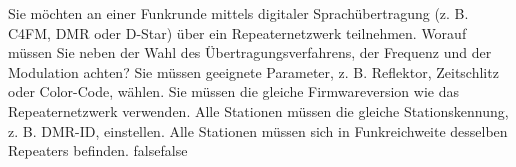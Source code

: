     {Sie möchten an einer Funkrunde mittels digitaler Sprachübertragung (z. B. C4FM, DMR oder D-Star) über ein Repeaternetzwerk teilnehmen. Worauf müssen Sie neben der Wahl des Übertragungsverfahrens, der Frequenz und der Modulation achten?}
    {Sie müssen geeignete Parameter, z. B. Reflektor, Zeitschlitz oder Color-Code, wählen.}
    {Sie müssen die gleiche Firmwareversion wie das Repeaternetzwerk verwenden.}
    {Alle Stationen müssen die gleiche Stationskennung, z. B. DMR-ID, einstellen.}
    {Alle Stationen müssen sich in Funkreichweite desselben Repeaters befinden.}
    {false}{false}